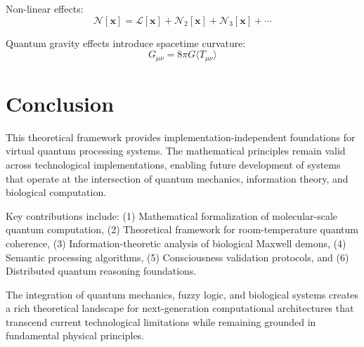 \documentclass[12pt]{article}
\begin{document}
Non-linear effects:
\begin{equation}
\mathcal{N}[\mathbf{x}] = \mathcal{L}[\mathbf{x}] + \mathcal{N}_2[\mathbf{x}] + \mathcal{N}_3[\mathbf{x}] + \cdots
\end{equation}

Quantum gravity effects introduce spacetime curvature:
\begin{equation}
G_{\mu\nu} = 8\pi G \langle T_{\mu\nu} \rangle
\end{equation}

\section{Conclusion}

This theoretical framework provides implementation-independent foundations for virtual quantum processing systems. The mathematical principles remain valid across technological implementations, enabling future development of systems that operate at the intersection of quantum mechanics, information theory, and biological computation.

Key contributions include: (1) Mathematical formalization of molecular-scale quantum computation, (2) Theoretical framework for room-temperature quantum coherence, (3) Information-theoretic analysis of biological Maxwell demons, (4) Semantic processing algorithms, (5) Consciousness validation protocols, and (6) Distributed quantum reasoning foundations.

The integration of quantum mechanics, fuzzy logic, and biological systems creates a rich theoretical landscape for next-generation computational architectures that transcend current technological limitations while remaining grounded in fundamental physical principles.
\end{document}

